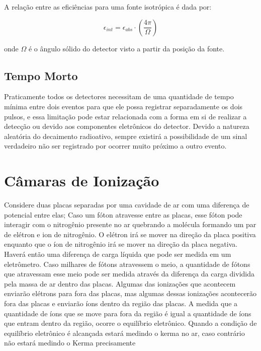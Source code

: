 \documentclass[11pt,a4paper]{article}
\begin{document}
		A relação entre as eficiências para uma fonte isotrópica é dada por:

			\begin{equation}
					\epsilon_{int} = \epsilon_{abs} \cdot \left(\frac{4 \pi}{\Omega}\right)
			\end{equation}

		\noindent onde $\Omega$ é o ângulo sólido do detector visto a partir da posição da fonte.

	\subsection{Tempo Morto}

		Praticamente todos os detectores necessitam de uma quantidade de tempo mínima entre dois eventos para que ele possa registrar separadamente os dois pulsos, e essa limitação pode estar relacionada com a forma em si de realizar a detecção ou devido aos componentes eletrônicos do detector. Devido a natureza aleatória do decaimento radioativo, sempre existirá a possibilidade de um sinal verdadeiro não ser registrado por ocorrer muito próximo a outro evento. 

	\section{Câmaras de Ionização}

		Considere duas placas separadas por uma cavidade de ar com uma diferença de potencial entre elas; Caso um fóton atravesse entre as placas, esse fóton pode interagir com o nitrogênio presente no ar quebrando a molécula formando um par de elétron e ion de nitrogênio. O elétron irá se mover na direção da placa positiva enquanto que o íon de nitrogênio irá se mover na direção da placa negativa. Haverá então uma diferença de carga líquida que pode ser medida em um eletrômetro. Caso milhares de fótons atravessem o meio, a quantidade de fótons que atravessam esse meio pode ser medida através da diferença da carga dividida pela massa de ar dentro das placas. Algumas das ionizações que acontecem enviarão elétrons para fora das placas, mas algumas dessas ionizações acontecerão fora das placas e enviarão íons dentro da região das placas. A medida que a quantidade de íons que se move para fora da região é igual a quantidade de íons que entram dentro da região, ocorre o equilíbrio eletrônico. Quando a condição de equilíbrio eletrônico é alcançada estará medindo o kerma no ar, caso contrário não estará medindo o Kerma precisamente
\end{document}

